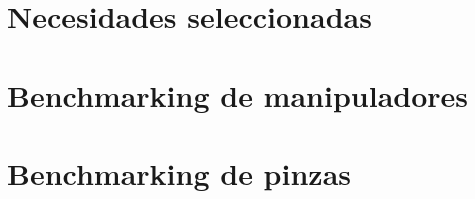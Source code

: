 \documentclass[12pt,twoside]{report}
\begin{document}
\chapter{Necesidades seleccionadas}


\chapter{Benchmarking de manipuladores}


\chapter{Benchmarking de pinzas}




\end{document}
